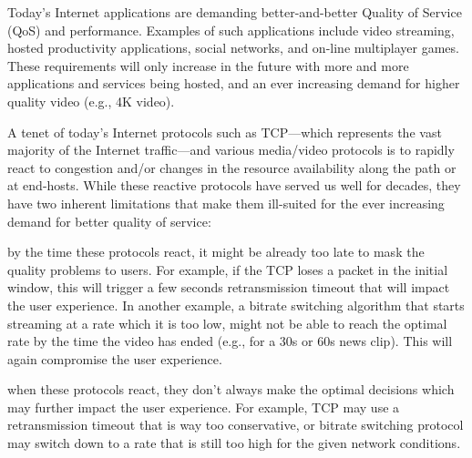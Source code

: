 


Today's Internet applications are demanding better-and-better Quality of Service (QoS) and performance. Examples of such applications include video streaming, hosted productivity applications, social networks, and on-line multiplayer games. These requirements will only increase in the future with more and more applications and services being hosted, and an ever increasing demand for higher quality video (e.g., 4K video).

A tenet of today's Internet protocols such as TCP---which represents the vast majority of the Internet traffic---and various media/video protocols is to rapidly react to congestion and/or changes in the resource availability along the path or at end-hosts. While these reactive protocols have served us well for decades, they have two inherent limitations that make them ill-suited for the ever increasing demand for better quality of service: 

 by the time these protocols react, it might be already too late to mask the quality problems to users. For example, if the TCP loses a packet in the initial window, this will trigger a few seconds retransmission timeout that will impact the user experience. In another example, a bitrate switching algorithm that starts streaming at a rate which it is too low, might not be able to reach the optimal rate by the time the video has ended (e.g., for a 30s or 60s news clip). This will again compromise the user experience.

 when these protocols react, they don't always make the optimal decisions which may further impact the user experience. For example, TCP may use a retransmission timeout that is way too conservative, or bitrate switching protocol may switch down to a rate that is still too high for the given network conditions.

